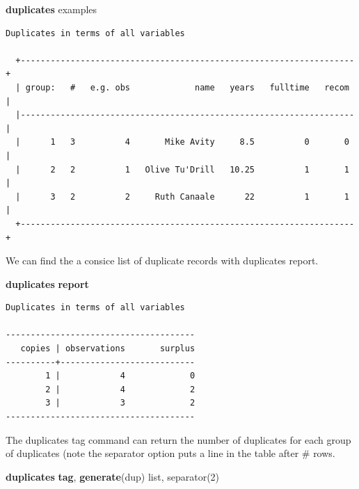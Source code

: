 \documentclass[
]{book}
\newenvironment{Shaded}{\begin{snugshade}}{\end{snugshade}}
\newcommand{\FunctionTok}[1]{\textcolor[rgb]{0.13,0.29,0.53}{\textbf{#1}}}
\newcommand{\KeywordTok}[1]{\textcolor[rgb]{0.13,0.29,0.53}{\textbf{#1}}}
\newcommand{\NormalTok}[1]{#1}
\newcommand{\OtherTok}[1]{\textcolor[rgb]{0.56,0.35,0.01}{#1}}
\begin{document}
\begin{Shaded}
\begin{Highlighting}[]
\KeywordTok{duplicates}\NormalTok{ examples }
\end{Highlighting}
\end{Shaded}

\begin{verbatim}
Duplicates in terms of all variables

  +-------------------------------------------------------------------+
  | group:   #   e.g. obs             name   years   fulltime   recom |
  |-------------------------------------------------------------------|
  |      1   3          4       Mike Avity     8.5          0       0 |
  |      2   2          1   Olive Tu'Drill   10.25          1       1 |
  |      3   2          2     Ruth Canaale      22          1       1 |
  +-------------------------------------------------------------------+
\end{verbatim}

We can find the a consice list of duplicate records with duplicates report.

\begin{Shaded}
\begin{Highlighting}[]
\KeywordTok{duplicates} \KeywordTok{report}
\end{Highlighting}
\end{Shaded}

\begin{verbatim}
Duplicates in terms of all variables

--------------------------------------
   copies | observations       surplus
----------+---------------------------
        1 |            4             0
        2 |            4             2
        3 |            3             2
--------------------------------------
\end{verbatim}

The duplicates tag command can return the number of duplicates for each group of duplicates (note the separator option puts a line in the table after \# rows.

\begin{Shaded}
\begin{Highlighting}[]
\KeywordTok{duplicates} \FunctionTok{tag}\NormalTok{, }\KeywordTok{generate}\NormalTok{(dup)}
\OtherTok{list}\NormalTok{, separator(2)}
\end{Highlighting}
\end{Shaded}
\end{document}
